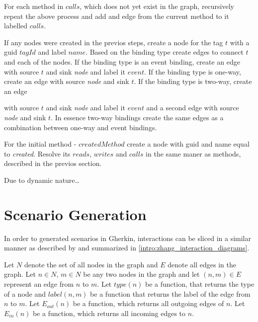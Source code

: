 For each method in $calls$, which does not yet exist in the graph, recursively repeat the above process and add and edge from the current method to it labelled $calls$. 


If any nodes were created in the previos steps, create a node for the tag $t$ with a \gls{guid} $tagId$ and label $name$. Based on the binding type create edges to connect $t$ and each of the nodes.
If the binding type is an event binding, create an 
edge with source $t$ and sink \textit{node} and label it $event$. 
If the binding type is one-way, create an edge with source \textit{node} and sink $t$.
If the binding type is two-way, create an edge

with source $t$ and sink \textit{node} and label it $event$ and a second edge with source \textit{node} and sink $t$. In essence two-way bindings create the same edges as a combination between one-way and event bindings.

For the initial method - $createdMethod$ create a node with \gls{guid} and name equal to \textit{created}. Resolve its $reads$, $writes$ and $calls$ in the same maner as methods, described in the previos section.



Due to dynamic nature\dots
\section{Scenario Generation}

In order to generated scenarios in Gherkin, interactions can be sliced in a similar manner as described by \textcite{zhang2019scenario} and summarized in \ref{intro:zhang_interaction_diagrams}.

Let $N$ denote the set of all nodes in the graph and $E$ denote all edges in the graph. Let $n \in N$, $m \in N$ be any two nodes in the graph and let $(n, m) \in E $ represent an edge from $n$ to $m$. Let $type(n)$ be a function, that returns the type of a node and $label(n, m)$ be a function that returns the label of the edge from $n$ to $m$. Let $E_{out}(n)$ be a function, which returns all outgoing edges of $n$.
Let $E_{in}(n)$ be a function, which returns all incoming edges to $n$.

